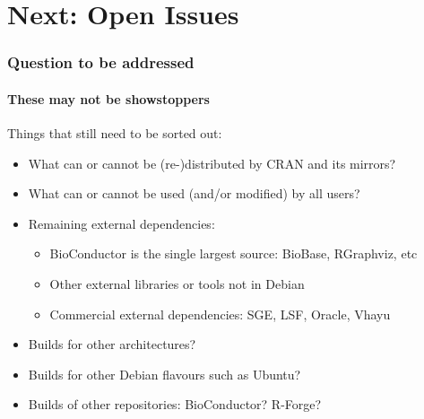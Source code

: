 \documentclass[smaller,compress]{beamer}
\begin{document}
\section[Next]{Next: Open Issues}
\begin{frame}
  \frametitle{Question to be addressed}
  \framesubtitle{These may not be showstoppers}

  Things that still need to be sorted out:
  \begin{itemize}
  \item What can or cannot be (re-)distributed by CRAN and its mirrors?
  \item What can or cannot be used (and/or modified) by all users?
  \item Remaining external dependencies: 
    \begin{itemize}
      \item BioConductor is the single largest source: BioBase, RGraphviz, etc
      \item Other external libraries or tools not in Debian 
      \item Commercial external dependencies: SGE, LSF, Oracle, Vhayu
    \end{itemize}
  \item Builds for other architectures?
  \item Builds for other Debian flavours such as Ubuntu?
  \item Builds of other repositories: BioConductor? R-Forge?
  \end{itemize}
\end{frame}
\end{document}
